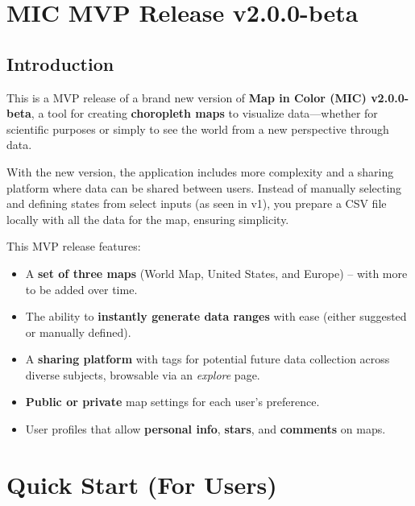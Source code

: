 \documentclass{article}
\title{}
\author{}
\date{} %
\begin{document}
\maketitle

\section{MIC MVP Release v2.0.0-beta}

\subsection{Introduction}
This is a MVP release of a brand new version of \textbf{Map in Color (MIC) v2.0.0-beta},
a tool for creating \textbf{choropleth maps} to visualize data---whether for scientific 
purposes or simply to see the world from a new perspective through data.

With the new version, the application includes more complexity and a sharing platform 
where data can be shared between users. Instead of manually selecting and defining 
states from select inputs (as seen in v1), you prepare a CSV file locally with all 
the data for the map, ensuring simplicity.

This MVP release features:
\begin{itemize}
  \item A \textbf{set of three maps} (World Map, United States, and Europe) -- with 
        more to be added over time.
  \item The ability to \textbf{instantly generate data ranges} with ease (either 
        suggested or manually defined).
  \item A \textbf{sharing platform} with tags for potential future data collection 
        across diverse subjects, browsable via an \emph{explore} page.
  \item \textbf{Public or private} map settings for each user’s preference.
  \item User profiles that allow \textbf{personal info}, \textbf{stars}, 
        and \textbf{comments} on maps.
\end{itemize}

\section{Quick Start (For Users)}
\end{document}

